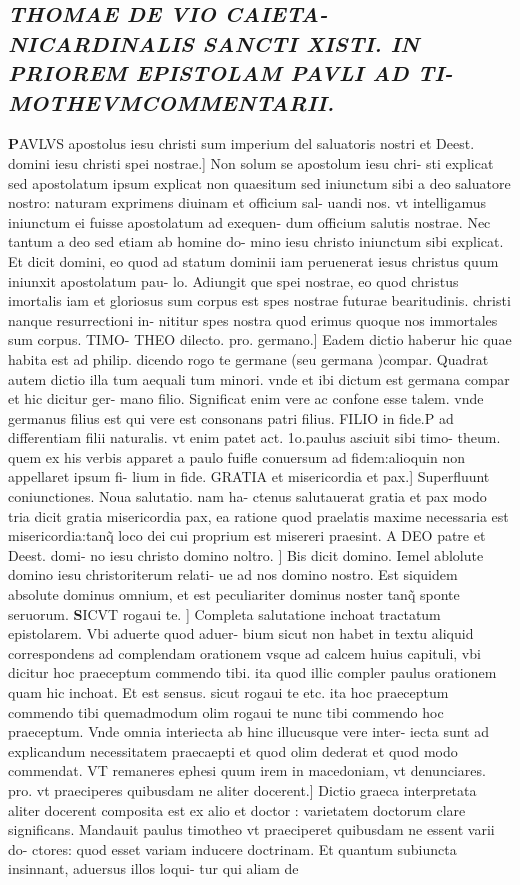 \documentclass{article}
\begin{document}
\begin{pages}
\subsection*{\textit{THOMAE DE VIO CAIETA- NICARDINALIS SANCTI XISTI. IN PRIOREM EPISTOLAM PAVLI AD TI- MOTHEVMCOMMENTARII. }}\pstart \huge\textbf{P}\normalsize AVLVS apostolus iesu christi sum imperium del saluatoris nostri et Deest. domini iesu christi spei nostrae.] Non solum se apostolum iesu chri- sti explicat sed apostolatum ipsum explicat non quaesitum sed iniunctum sibi a deo saluatore nostro: naturam exprimens diuinam et officium sal- uandi nos. vt intelligamus iniunctum ei fuisse apostolatum ad exequen- dum officium salutis nostrae. Nec tantum a deo sed etiam ab homine do- mino iesu christo iniunctum sibi explicat. Et dicit domini, eo quod ad statum dominii iam peruenerat iesus christus quum iniunxit apostolatum pau- lo. Adiungit que  spei nostrae, eo quod christus imortalis iam et gloriosus sum corpus  est spes nostrae futurae bearitudinis. christi nanque  resurrectioni in- nititur spes nostra quod erimus quoque  nos immortales sum corpus. TIMO- THEO dilecto. pro. germano.] Eadem dictio haberur hic quae habita est ad philip. dicendo rogo te germane (seu germana )compar. Quadrat autem dictio illa tum aequali tum minori. vnde et ibi dictum est germana compar  et hic dicitur ger- mano filio. Significat enim vere ac confone esse talem. vnde germanus filius est qui vere est consonans patri filius. FILIO in fide.P ad differentiam filii naturalis. vt enim patet act. 1o.paulus asciuit sibi timo- theum. quem ex his verbis apparet a paulo fuifle conuersum ad fidem:alioquin non appellaret ipsum fi- lium in fide. GRATIA et misericordia et pax.] Superfluunt coniunctiones. Noua salutatio. nam ha- ctenus salutauerat gratia et pax  modo tria dicit gratia misericordia pax, ea ratione quod praelatis maxime necessaria est misericordia:tanq̃ loco dei cui proprium est misereri  praesint. A DEO patre et Deest. domi- no  iesu christo domino noltro. ] Bis dicit domino. Iemel ablolute  domino iesu christoriterum relati- ue ad nos domino nostro. Est siquidem absolute dominus omnium, et est peculiariter dominus noster tanq̃ sponte seruorum.  \pend\pstart \huge\textbf{S}\normalsize ICVT rogaui te. ] Completa salutatione inchoat tractatum epistolarem. Vbi aduerte quod aduer- bium sicut non habet in textu aliquid correspondens ad complendam orationem vsque  ad calcem huius capituli, vbi dicitur  hoc praeceptum commendo tibi. ita quod illic compler paulus orationem quam hic inchoat. Et est sensus. sicut rogaui te etc.  ita hoc praeceptum commendo tibi  quemadmodum olim rogaui te nunc tibi commendo hoc praeceptum. Vnde omnia interiecta ab hinc illucusque   vere inter- iecta sunt ad explicandum necessitatem praecaepti  et quod olim dederat et quod modo commendat. VT remaneres ephesi quum irem in macedoniam, vt denunciares. pro. vt praeciperes  quibusdam ne aliter docerent.] Dictio graeca interpretata aliter docerent composita est ex alio et doctor : varietatem doctorum clare significans. Mandauit paulus timotheo vt praeciperet quibusdam ne essent varii do- ctores: quod esset variam inducere doctrinam. Et quantum subiuncta insinnant, aduersus illos loqui- tur qui aliam de 
\end{pages}
\end{document}
